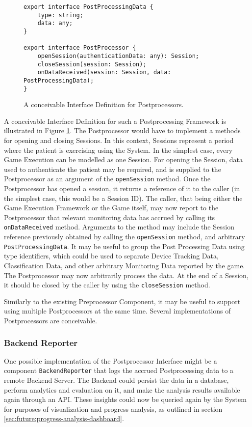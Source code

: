 \begin{figure}
\begin{verbatim}
export interface PostProcessingData {
    type: string;
    data: any;
}

export interface PostProcessor {
    openSession(authenticationData: any): Session;
    closeSession(session: Session);
    onDataReceived(session: Session, data: PostProcessingData);
}
\end{verbatim}
\caption{A conceivable Interface Definition for Postprocessors.}
\label{fig:postprocessors}
\end{figure}

A conceivable Interface Definition for such a Postprocessing Framework is illustrated in Figure \ref{fig:postprocessors}. The Postprocessor would have to implement a methods for opening and closing Sessions. In this context, Sessions represent a period where the patient is exercising using the System. In the simplest case, every Game Execution can be modelled as one Session. For opening the Session, data used to authenticate the patient may be required, and is supplied to the Postprocessor as an argument of the \texttt{openSession} method. Once the Postprocessor has opened a session, it returns a reference of it to the caller (in the simplest case, this would be a Session ID). The caller, that being either the Game Execution Framework or the Game itself, may now report to the Postprocessor that relevant monitoring data has accrued by calling its \texttt{onDataReceived} method. Arguments to the method may include the Session reference previously obtained by calling the \texttt{openSession} method, and arbitrary \texttt{PostProcessingData}. It may be useful to group the Post Processing Data using type identifiers, which could be used to separate Device Tracking Data, Classification Data, and other arbitrary Monitoring Data reported by the game. The Postprocessor may now arbitrarily process the data. At the end of a Session, it should be closed by the caller by using the \texttt{closeSession} method.

Similarly to the existing Preprocessor Component, it may be useful to support using multiple Postprocessors at the same time. Several implementations of Postprocessors are conceivable.

\subsubsection{Backend Reporter}
\label{sec:future:backend-reporter}
One possible implementation of the Postprocessor Interface might be a component \texttt{BackendReporter} that logs the accrued Postprocessing data to a remote Backend Server. The Backend could persist the data in a database, perform analytics and evaluation on it, and make the analysis results available again through an API. These insights could now be queried again by the System for purposes of visualization and progress analysis, as outlined in section \ref{sec:future:progress-analysis-dashboard}.

